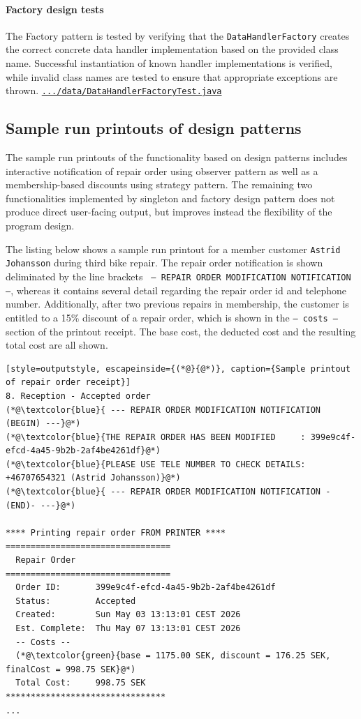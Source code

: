 \documentclass[a4paper]{scrartcl}
\begin{document}
\paragraph{Factory design tests}

The Factory pattern is tested by verifying that the \texttt{DataHandlerFactory} creates the correct concrete data handler implementation based on the provided class name. Successful instantiation of known handler implementations is verified, while invalid class names are tested to ensure that appropriate exceptions are thrown. \href{https://github.com/mo-mosverkstad/java-learning/blob/183fd32417c1e32630f41e821e872cda2c43eda9/maven-projects/ElectricBikeRepair/src/test/java/se/ebikerepair/data/DataHandlerFactoryTest.java}{\nolinkurl{.../data/DataHandlerFactoryTest.java}} \cite{sourcecode}

\subsection{Sample run printouts of design patterns}
The sample run printouts of the functionality based on design patterns includes interactive notification of repair order using observer pattern as well as a membership-based discounts using strategy pattern. The remaining two functionalities implemented by singleton and factory design pattern does not produce direct user-facing output, but improves instead the flexibility of the program design. 

The listing below shows a sample run printout for a member customer \texttt{Astrid Johansson} during third bike repair. The repair order notification is shown deliminated by the line brackets \texttt{ --- REPAIR ORDER MODIFICATION NOTIFICATION ---}, whereas it contains several detail regarding the repair order id and telephone number. Additionally, after two previous repairs in membership, the customer is entitled to a 15\% discount of a repair order, which is shown in the \texttt{-- costs --} section of the printout receipt. The base cost, the deducted cost and the resulting total cost are all shown.

\begin{lstlisting}[style=outputstyle, escapeinside={(*@}{@*)}, caption={Sample printout of repair order receipt}]
8. Reception - Accepted order
(*@\textcolor{blue}{ --- REPAIR ORDER MODIFICATION NOTIFICATION (BEGIN) ---}@*)
(*@\textcolor{blue}{THE REPAIR ORDER HAS BEEN MODIFIED     : 399e9c4f-efcd-4a45-9b2b-2af4be4261df}@*)
(*@\textcolor{blue}{PLEASE USE TELE NUMBER TO CHECK DETAILS: +46707654321 (Astrid Johansson)}@*)
(*@\textcolor{blue}{ --- REPAIR ORDER MODIFICATION NOTIFICATION -(END)- ---}@*)

**** Printing repair order FROM PRINTER ****
=================================
  Repair Order
=================================
  Order ID:       399e9c4f-efcd-4a45-9b2b-2af4be4261df
  Status:         Accepted
  Created:        Sun May 03 13:13:01 CEST 2026
  Est. Complete:  Thu May 07 13:13:01 CEST 2026
  -- Costs --
  (*@\textcolor{green}{base = 1175.00 SEK, discount = 176.25 SEK, finalCost = 998.75 SEK}@*)
  Total Cost:     998.75 SEK
********************************
...
\end{lstlisting}
\end{document}
